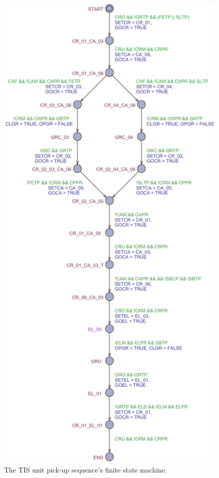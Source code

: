 \documentclass{ieeeojies}
\begin{document}
\begin{figure}[b!]
    \centering
    \includegraphics[width=0.95\columnwidth]{pictures/lilli03.png}
    \caption{The TIS unit pick-up sequence's finite state machine.} 
    \label{fig:fsm}
\end{figure}
\end{document}
